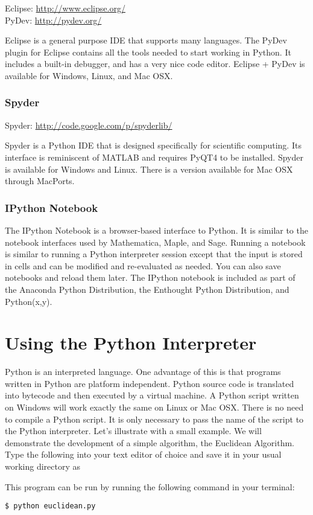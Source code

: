 Eclipse: \url{http://www.eclipse.org/} \\
PyDev: \url{http://pydev.org/}

Eclipse is a general purpose IDE that supports many languages.
The PyDev plugin for Eclipse contains all the tools needed to start working in Python.
It includes a built-in debugger, and has a very nice code editor.
Eclipse + PyDev is available for Windows, Linux, and Mac OSX.

\subsubsection*{Spyder}

Spyder: \url{http://code.google.com/p/spyderlib/}   %

Spyder is a Python IDE that is designed specifically for scientific computing.
Its interface is reminiscent of MATLAB and requires PyQT4 to be installed.
Spyder is available for Windows and Linux.
There is a version available for Mac OSX through MacPorts.

\subsubsection*{IPython Notebook}
The IPython Notebook is a browser-based interface to Python.
It is similar to the notebook interfaces used by Mathematica, Maple, and Sage.
Running a notebook is similar to running a Python interpreter session except that
the input is stored in cells and can be modified and re-evaluated as needed.
You can also save notebooks and reload them later.
The IPython notebook is included as part of the Anaconda Python Distribution, the
Enthought Python Distribution, and Python(x,y).


\section*{Using the Python Interpreter}
Python is an interpreted language.
One advantage of this is that programs written in Python are platform independent.
Python source code is translated into bytecode and then executed by a virtual machine.
A Python script written on Windows will work exactly the same on Linux or Mac OSX.
There is no need to compile a Python script.
It is only necessary to pass the name of the script to the Python interpreter.
Let's illustrate with a small example.
We will demonstrate the development of a simple algorithm, the Euclidean Algorithm.
Type the following into your text editor of choice and save it in your usual working directory as 

This program can be run by running the following command in your terminal:
\begin{lstlisting}
$ python euclidean.py
\end{lstlisting}


